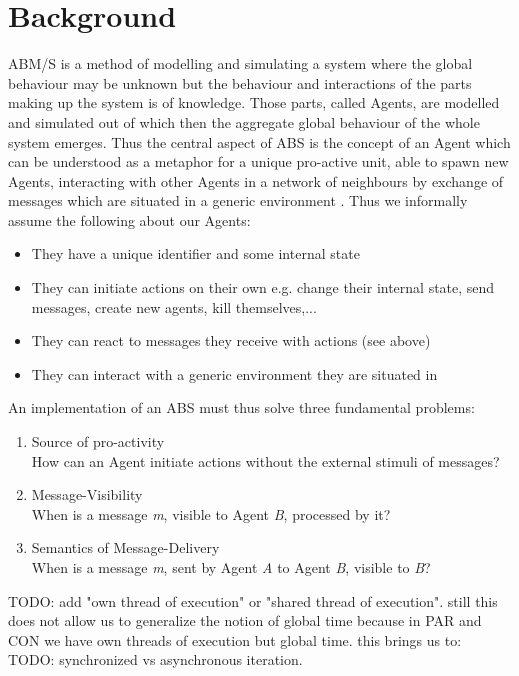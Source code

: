 \section{Background}
ABM/S is a method of modelling and simulating a system where the global behaviour may be unknown but the behaviour and interactions of the parts making up the system is of knowledge. Those parts, called Agents, are modelled and simulated out of which then the aggregate global behaviour of the whole system emerges. Thus the central aspect of ABS is the concept of an Agent which can be understood as a metaphor for a unique pro-active unit, able to spawn new Agents, interacting with other Agents in a network of neighbours by exchange of messages which are situated in a generic environment \cite{wooldridge_introduction_2009}. Thus we informally assume the following about our Agents:

\begin{itemize}
	\item They have a unique identifier and some internal state
	\item They can initiate actions on their own e.g. change their internal state, send messages, create new agents, kill themselves,...
	\item They can react to messages they receive with actions (see above)
	\item They can interact with a generic environment they are situated in
\end{itemize} 

An implementation of an ABS must thus solve three fundamental problems:
\begin{enumerate}
	\item Source of pro-activity \\ How can an Agent initiate actions without the external stimuli of messages?
	\item Message-Visibility \\ When is a message \textit{m}, visible to Agent \textit{B}, processed by it?
	\item Semantics of Message-Delivery \\ When is a message \textit{m}, sent by Agent \textit{A} to Agent \textit{B}, visible to \textit{B}?
\end{enumerate}

TODO: add "own thread of execution" or "shared thread of execution". still this does not allow us to generalize the notion of global time because in PAR and CON we have own threads of execution but global time. this brings us to:
TODO: synchronized vs asynchronous iteration. 

